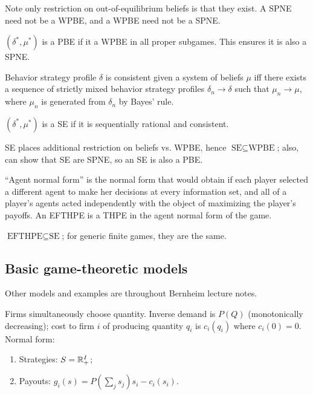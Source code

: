\documentclass[8pt,letterpaper, landscape]{extarticle} %
\begin{document}
\begin{multicols}{3}
\begin{description}
Note only restriction on out-of-equilibrium beliefs is that they exist. A SPNE need not be a WPBE, and a WPBE need not be a SPNE.

 $ (\delta^* , \mu^*) $ is a PBE if it a WPBE in all proper subgames. This ensures it is also a SPNE.

 Behavior strategy profile $ \delta $ is consistent given a system of beliefs $ \mu $ iff there exists a sequence of strictly mixed behavior strategy profiles $ \delta_n \to \delta $ such that $ \mu_n \to \mu $, where $ \mu_n $ is generated from $ \delta_n $ by Bayes' rule.

 $ (\delta^* , \mu^*) $ is a SE if it is sequentially rational  and consistent.

SE places additional restriction on beliefs vs. WPBE, hence $ \text{SE} \subseteq \text{WPBE} $; also, can show that SE are SPNE, so an SE is also a PBE.

 ``Agent normal form'' is the normal form that would obtain if each player selected a different agent to make her decisions at every information set, and all of a player's agents acted independently with the object of maximizing the player's payoffs. An EFTHPE is a THPE in the agent normal form of the game.

$ \text{EFTHPE} \subseteq \text{SE} $; for generic finite games, they are the same.

\subsection{Basic game-theoretic models}
Other models and examples are throughout Bernheim lecture notes.

 Firms simultaneously choose quantity. Inverse demand is $ P(Q) $ (monotonically decreasing); cost to firm $ i $ of producing quantity $ q_i $ is $ c_i (q_i) $ where $ c_i (0) = 0 $. Normal form:
\begin{enumerate}
\item Strategies: $ S = \mathbb{R}_{+}^{I} $;
\item Payouts: $ g_i (s) = P(\sum_j s_j) s_i - c_i (s_i) $.
\end{enumerate}


\end{description}
\end{multicols}
\end{document}
